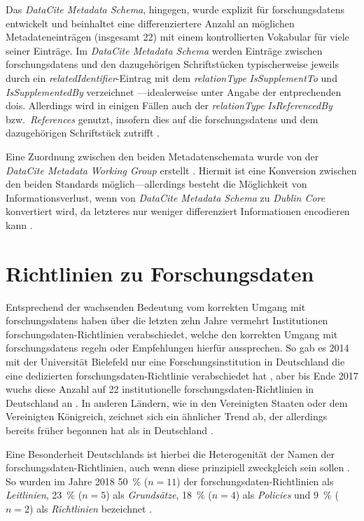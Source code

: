 Das \textit{DataCite Metadata Schema}, hingegen, wurde explizit für \glspl{forschungsdaten} entwickelt und beinhaltet eine differenziertere Anzahl an möglichen Metadateneinträgen (insgesamt \num{22}) mit einem kontrollierten Vokabular für viele seiner Einträge.
Im \textit{DataCite Metadata Schema} werden Einträge zwischen \glspl{forschungsdaten} und den dazugehörigen Schriftstücken typischerweise jeweils durch ein \textit{relatedIdentifier}-Eintrag mit dem \textit{relationType} \textit{IsSupplementTo} und \textit{IsSupplementedBy} verzeichnet \autocite{starr2011iscitedby,Cousijn2019}---idealerweise unter Angabe der entprechenden \glspl{doi}.
Allerdings wird in einigen Fällen auch der \textit{relationType} \textit{IsReferencedBy} bzw.~\textit{References} genutzt, insofern dies auf die \glspl{forschungsdaten} und dem dazugehörigen Schriftstück zutrifft \autocite{Cousijn2019}.

Eine Zuordnung zwischen den beiden Metadatenschemata wurde von der \textit{DataCite Metadata Working Group} erstellt \autocite{datacite-mapping}.
Hiermit ist eine Konversion zwischen den beiden Standards möglich---allerdings besteht die Möglichkeit von Informationsverlust, wenn von \textit{DataCite Metadata Schema} zu \textit{Dublin Core} konvertiert wird, da letzteres nur weniger differenziert Informationen encodieren kann \autocite{datacite-mapping}.

\section{Richtlinien zu Forschungsdaten}\label{sec:forschungsstand-guidelines}
Entsprechend der wachsenden Bedeutung vom korrekten Umgang mit \glspl{forschungsdaten} haben über die letzten zehn Jahre vermehrt Institutionen \gls{forschungsdaten}-Richtlinien verabschiedet, welche den korrekten Umgang mit \glspl{forschungsdaten} regeln oder Empfehlungen hierfür aussprechen.
So gab es 2014 mit der Universität Bielefeld nur eine Forschungsinstitution in Deutschland die eine dedizierten \gls{forschungsdaten}-Richtlinie verabschiedet hat \autocite[6]{hrk-fdm}, aber bis Ende 2017 wuchs diese Anzahl auf \num{22} institutionelle \gls{forschungsdaten}-Richtlinien in Deutschland an \autocite{Hiemenz2018-fdm-report}.
In anderen Ländern, wie in den Vereinigten Staaten oder dem Vereinigten Königreich, zeichnet sich ein ähnlicher Trend ab, der allerdings bereits früher begonnen hat als in Deutschland \autocite{hrk-fdm,Briney2015-Policy}.

Eine Besonderheit Deutschlands ist hierbei die Heterogenität der Namen der \gls{forschungsdaten}-Richtlinien, auch wenn diese prinzipiell zweckgleich sein sollen \autocite{Hiemenz2018-fdm-title,Hiemenz2018-fdm-title}.
So wurden im Jahre 2018 \SI{50}{\percent} ($n=11$) der \gls{forschungsdaten}-Richtlinien als \textit{Leitlinien}, \SI{23}{\percent} ($n=5$) als \textit{Grundsätze}, \SI{18}{\percent} ($n=4$) als \textit{Policies} und \SI{9}{\percent} ($n=2$) als \textit{Richtlinien} bezeichnet \autocite[5]{Hiemenz2018-fdm-title}.

